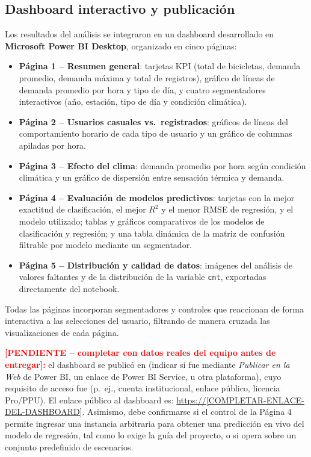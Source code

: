 \documentclass[conference]{IEEEtran}
\begin{document}
\subsection{Dashboard interactivo y publicación}

Los resultados del análisis se integraron en un dashboard desarrollado en \textbf{Microsoft Power BI Desktop}, organizado en cinco páginas:

\begin{itemize}
\item \textbf{Página 1 -- Resumen general}: tarjetas KPI (total de bicicletas, demanda promedio, demanda máxima y total de registros), gráfico de líneas de demanda promedio por hora y tipo de día, y cuatro segmentadores interactivos (año, estación, tipo de día y condición climática).
\item \textbf{Página 2 -- Usuarios casuales vs.\ registrados}: gráficos de líneas del comportamiento horario de cada tipo de usuario y un gráfico de columnas apiladas por hora.
\item \textbf{Página 3 -- Efecto del clima}: demanda promedio por hora según condición climática y un gráfico de dispersión entre sensación térmica y demanda.
\item \textbf{Página 4 -- Evaluación de modelos predictivos}: tarjetas con la mejor exactitud de clasificación, el mejor $R^2$ y el menor RMSE de regresión, y el modelo utilizado; tablas y gráficos comparativos de los modelos de clasificación y regresión; y una tabla dinámica de la matriz de confusión filtrable por modelo mediante un segmentador.
\item \textbf{Página 5 -- Distribución y calidad de datos}: imágenes del análisis de valores faltantes y de la distribución de la variable \texttt{cnt}, exportadas directamente del notebook.
\end{itemize}

Todas las páginas incorporan segmentadores y controles que reaccionan de forma interactiva a las selecciones del usuario, filtrando de manera cruzada las visualizaciones de cada página.

\textcolor{red}{\textbf{[PENDIENTE -- completar con datos reales del equipo antes de entregar]:}} el dashboard se publicó en \underline{\hspace{2.2cm}} (indicar si fue mediante \textit{Publicar en la Web} de Power BI, un enlace de Power BI Service, u otra plataforma), cuyo requisito de acceso fue \underline{\hspace{2.2cm}} (p.\ ej., cuenta institucional, enlace público, licencia Pro/PPU). El enlace público al dashboard es: \url{https://[COMPLETAR-ENLACE-DEL-DASHBOARD]}. Asimismo, debe confirmarse si el control de la Página 4 permite ingresar una instancia arbitraria para obtener una predicción en vivo del modelo de regresión, tal como lo exige la guía del proyecto, o si opera sobre un conjunto predefinido de escenarios.
\end{document}
